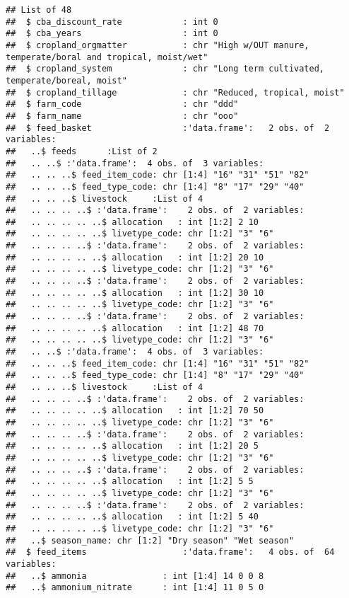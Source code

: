 \documentclass[
]{article}
\begin{document}
\begin{verbatim}
## List of 48
##  $ cba_discount_rate            : int 0
##  $ cba_years                    : int 0
##  $ cropland_orgmatter           : chr "High w/OUT manure, temperate/boral and tropical, moist/wet"
##  $ cropland_system              : chr "Long term cultivated, temperate/boreal, moist"
##  $ cropland_tillage             : chr "Reduced, tropical, moist"
##  $ farm_code                    : chr "ddd"
##  $ farm_name                    : chr "ooo"
##  $ feed_basket                  :'data.frame':   2 obs. of  2 variables:
##   ..$ feeds      :List of 2
##   .. ..$ :'data.frame':  4 obs. of  3 variables:
##   .. .. ..$ feed_item_code: chr [1:4] "16" "31" "51" "82"
##   .. .. ..$ feed_type_code: chr [1:4] "8" "17" "29" "40"
##   .. .. ..$ livestock     :List of 4
##   .. .. .. ..$ :'data.frame':    2 obs. of  2 variables:
##   .. .. .. .. ..$ allocation   : int [1:2] 2 10
##   .. .. .. .. ..$ livetype_code: chr [1:2] "3" "6"
##   .. .. .. ..$ :'data.frame':    2 obs. of  2 variables:
##   .. .. .. .. ..$ allocation   : int [1:2] 20 10
##   .. .. .. .. ..$ livetype_code: chr [1:2] "3" "6"
##   .. .. .. ..$ :'data.frame':    2 obs. of  2 variables:
##   .. .. .. .. ..$ allocation   : int [1:2] 30 10
##   .. .. .. .. ..$ livetype_code: chr [1:2] "3" "6"
##   .. .. .. ..$ :'data.frame':    2 obs. of  2 variables:
##   .. .. .. .. ..$ allocation   : int [1:2] 48 70
##   .. .. .. .. ..$ livetype_code: chr [1:2] "3" "6"
##   .. ..$ :'data.frame':  4 obs. of  3 variables:
##   .. .. ..$ feed_item_code: chr [1:4] "16" "31" "51" "82"
##   .. .. ..$ feed_type_code: chr [1:4] "8" "17" "29" "40"
##   .. .. ..$ livestock     :List of 4
##   .. .. .. ..$ :'data.frame':    2 obs. of  2 variables:
##   .. .. .. .. ..$ allocation   : int [1:2] 70 50
##   .. .. .. .. ..$ livetype_code: chr [1:2] "3" "6"
##   .. .. .. ..$ :'data.frame':    2 obs. of  2 variables:
##   .. .. .. .. ..$ allocation   : int [1:2] 20 5
##   .. .. .. .. ..$ livetype_code: chr [1:2] "3" "6"
##   .. .. .. ..$ :'data.frame':    2 obs. of  2 variables:
##   .. .. .. .. ..$ allocation   : int [1:2] 5 5
##   .. .. .. .. ..$ livetype_code: chr [1:2] "3" "6"
##   .. .. .. ..$ :'data.frame':    2 obs. of  2 variables:
##   .. .. .. .. ..$ allocation   : int [1:2] 5 40
##   .. .. .. .. ..$ livetype_code: chr [1:2] "3" "6"
##   ..$ season_name: chr [1:2] "Dry season" "Wet season"
##  $ feed_items                   :'data.frame':   4 obs. of  64 variables:
##   ..$ ammonia               : int [1:4] 14 0 0 8
##   ..$ ammonium_nitrate      : int [1:4] 11 0 5 0

\end{verbatim}
\end{document}
